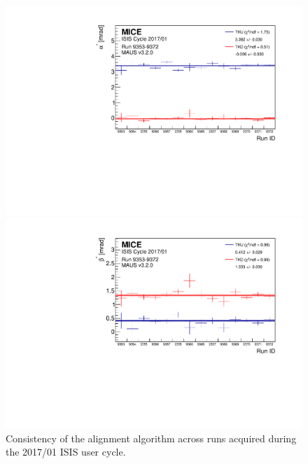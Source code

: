 \begin{figure} [!htb]
	\begin{minipage}[b]{.49\textwidth}
		\centering
		\includegraphics[width=\textwidth]{data_final/alpha_bestfit.pdf}
	\end{minipage}
	\hfill
	\begin{minipage}[b]{.49\textwidth}
		\centering
		\includegraphics[width=\textwidth]{data_final/beta_bestfit.pdf}
	\end{minipage}
	\caption{Consistency of the alignment algorithm across runs acquired during the 2017/01 ISIS user cycle.}
	\label{fig:runtorun}
\end{figure}
